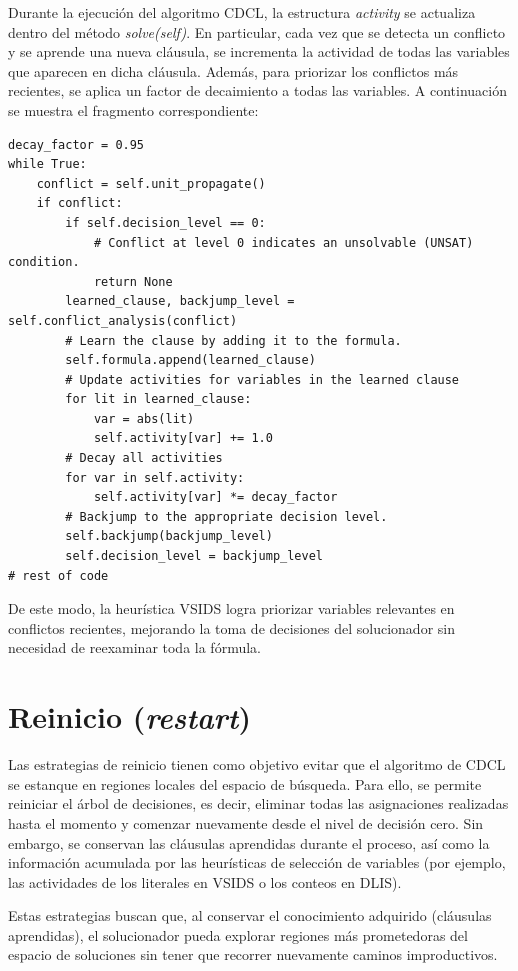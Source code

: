 Durante la ejecución del algoritmo CDCL, la estructura \textit{activity} se actualiza dentro del método \textit{solve(self)}. En particular, cada vez que se detecta un conflicto y se aprende una nueva cláusula, se incrementa la actividad de todas las variables que aparecen en dicha cláusula. Además, para priorizar los conflictos más recientes, se aplica un factor de decaimiento a todas las variables. A continuación se muestra el fragmento correspondiente:

\begin{lstlisting}
decay_factor = 0.95
while True:
    conflict = self.unit_propagate()
    if conflict:
        if self.decision_level == 0:
            # Conflict at level 0 indicates an unsolvable (UNSAT) condition.
            return None
        learned_clause, backjump_level = self.conflict_analysis(conflict)
        # Learn the clause by adding it to the formula.
        self.formula.append(learned_clause)
        # Update activities for variables in the learned clause
        for lit in learned_clause:
            var = abs(lit)
            self.activity[var] += 1.0
        # Decay all activities
        for var in self.activity:
            self.activity[var] *= decay_factor
        # Backjump to the appropriate decision level.
        self.backjump(backjump_level)
        self.decision_level = backjump_level
# rest of code
\end{lstlisting}

De este modo, la heurística VSIDS logra priorizar variables relevantes en conflictos recientes, mejorando la toma de decisiones del solucionador sin necesidad de reexaminar toda la fórmula.


\section{Reinicio (\textit{restart})}

Las estrategias de reinicio tienen como objetivo evitar que el algoritmo de CDCL se estanque en regiones locales del espacio de búsqueda. Para ello, se permite reiniciar el árbol de decisiones, es decir, eliminar todas las asignaciones realizadas hasta el momento y comenzar nuevamente desde el nivel de decisión cero. Sin embargo, se conservan las cláusulas aprendidas durante el proceso, así como la información acumulada por las heurísticas de selección de variables (por ejemplo, las actividades de los literales en VSIDS o los conteos en DLIS).

Estas estrategias buscan que, al conservar el conocimiento adquirido (cláusulas aprendidas), el solucionador pueda explorar regiones más prometedoras del espacio de soluciones sin tener que recorrer nuevamente caminos improductivos.

